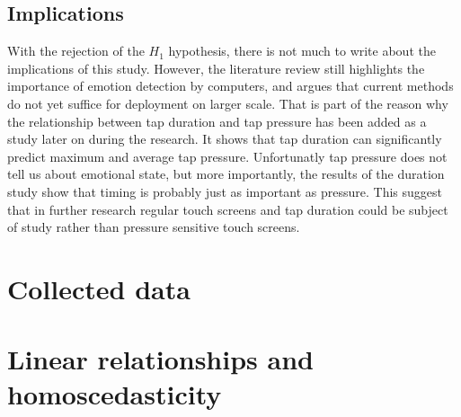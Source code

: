 \documentclass{sigchi}
\begin{document}
\subsection{Implications} %
\label{sub:implications}
With the rejection of the $H_1$ hypothesis, there is not much to write about the implications of this study. However, the literature review still highlights the importance of emotion detection by computers, and argues that current methods do not yet suffice for deployment on larger scale. That is part of the reason why the relationship between tap duration and tap pressure has been added as a study later on during the research. It shows that tap duration can significantly predict maximum and average tap pressure. Unfortunatly tap pressure does not tell us about emotional state, but more importantly, the results of the duration study show that timing is probably just as important as pressure. This suggest that in further research regular touch screens and tap duration could be subject of study rather than pressure sensitive touch screens.








\clearpage
\onecolumn

\appendix
\section{Collected data} %
\label{sec:collected_data}


\section{Linear relationships and homoscedasticity}
\label{app:linear_relationships}
\end{document}
